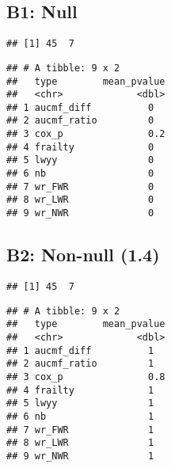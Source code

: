 \documentclass[
]{article}
\begin{document}
\subsection{B1: Null}\label{b1-null}

\begin{verbatim}
## [1] 45  7
\end{verbatim}

\begin{verbatim}
## # A tibble: 9 x 2
##   type        mean_pvalue
##   <chr>             <dbl>
## 1 aucmf_diff          0  
## 2 aucmf_ratio         0  
## 3 cox_p               0.2
## 4 frailty             0  
## 5 lwyy                0  
## 6 nb                  0  
## 7 wr_FWR              0  
## 8 wr_LWR              0  
## 9 wr_NWR              0
\end{verbatim}

\subsection{B2: Non-null (1.4)}\label{b2-non-null-1.4}

\begin{verbatim}
## [1] 45  7
\end{verbatim}

\begin{verbatim}
## # A tibble: 9 x 2
##   type        mean_pvalue
##   <chr>             <dbl>
## 1 aucmf_diff          1  
## 2 aucmf_ratio         1  
## 3 cox_p               0.8
## 4 frailty             1  
## 5 lwyy                1  
## 6 nb                  1  
## 7 wr_FWR              1  
## 8 wr_LWR              1  
## 9 wr_NWR              1
\end{verbatim}
\end{document}
